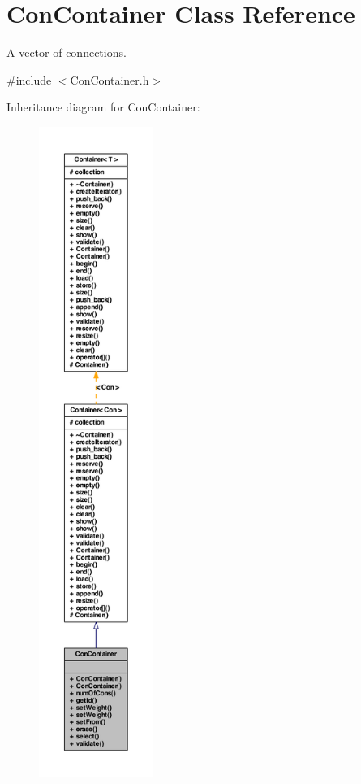 \hypertarget{class_con_container}{
\section{ConContainer Class Reference}
\label{class_con_container}
}


A vector of connections.  




{\ttfamily \#include $<$ConContainer.h$>$}



Inheritance diagram for ConContainer:
\nopagebreak
\begin{figure}[H]
\begin{center}
\leavevmode
\includegraphics[height=600pt]{class_con_container__inherit__graph}
\end{center}
\end{figure}


